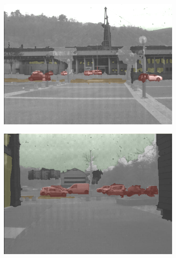 \begin{figure}[h]
	\centering
	
	\begin{subfigure}[b]{0.18\linewidth}   
		\centering 
		\includegraphics[width=\linewidth]{Figures/Aug/labels/overlayed/over1205.png}
	\end{subfigure}
	\begin{subfigure}[b]{0.18\linewidth}
		\centering
		\includegraphics[width=\linewidth]{Figures/Aug/labels/overlayed/over4427.png}
	\end{subfigure}
	\begin{subfigure}[b]{0.18\linewidth}  
		\centering 

\end{subfigure}
\end{figure}
